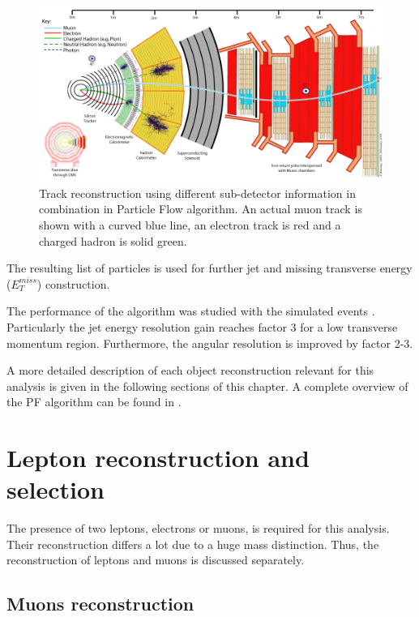 \begin{figure}[t]
  \centering
  \includegraphics[width=1.0\textwidth]{04_event_reconstruction/plots/CMS_Slice.png}
  \caption{Track reconstruction using different sub-detector information in combination in Particle Flow algorithm. An actual
  muon track is shown with a curved blue line, an electron track is red and a charged hadron is solid green.}
  \label{fig:PFmuons}
\end{figure}

The resulting list of particles is used for further jet and missing transverse energy ($E_{T}^{miss}$) construction. 

The performance of the algorithm was studied with the simulated events \cite{CMS-PAS-PFT-09-001}. Particularly the jet energy
resolution gain reaches factor 3 for a low transverse momentum region. Furthermore, the angular resolution is improved by factor 2-3.

A more detailed description of each object reconstruction relevant for this analysis is given in the following sections of this chapter.
A complete overview of the PF algorithm can be found in \cite{CMS-PAS-PFT-09-001}. 

\section{Lepton reconstruction and selection}

The presence of two leptons, electrons or muons, is required for this analysis. Their reconstruction
differs a lot due to a huge mass distinction. Thus, the reconstruction of leptons and muons is discussed separately.

\subsection{Muons reconstruction}

